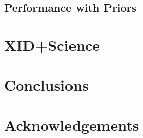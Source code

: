 \documentclass[useAMS,usenatbib]{mn2e}
\begin{document}
\subsection{Performance with Priors}
\section{XID+Science}
\section{Conclusions}



\section*{Acknowledgements} %
%
%
%


%
%
%
%
%
%
%
\end{document}
